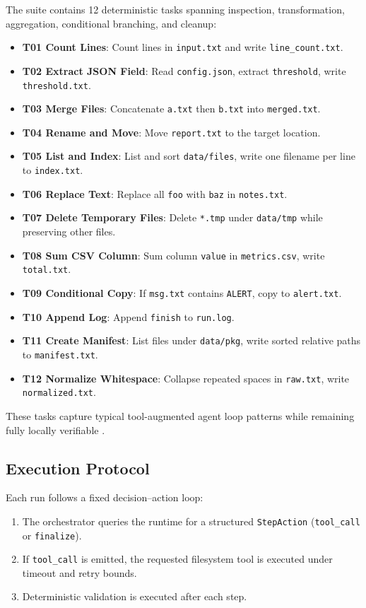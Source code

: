 The suite contains 12 deterministic tasks spanning inspection, transformation, aggregation, conditional branching, and cleanup:
\begin{itemize}
    \item \textbf{T01 Count Lines}: Count lines in \texttt{input.txt} and write \texttt{line\_count.txt}.
    \item \textbf{T02 Extract JSON Field}: Read \texttt{config.json}, extract \texttt{threshold}, write \texttt{threshold.txt}.
    \item \textbf{T03 Merge Files}: Concatenate \texttt{a.txt} then \texttt{b.txt} into \texttt{merged.txt}.
    \item \textbf{T04 Rename and Move}: Move \texttt{report.txt} to the target location.
    \item \textbf{T05 List and Index}: List and sort \texttt{data/files}, write one filename per line to \texttt{index.txt}.
    \item \textbf{T06 Replace Text}: Replace all \texttt{foo} with \texttt{baz} in \texttt{notes.txt}.
    \item \textbf{T07 Delete Temporary Files}: Delete \texttt{*.tmp} under \texttt{data/tmp} while preserving other files.
    \item \textbf{T08 Sum CSV Column}: Sum column \texttt{value} in \texttt{metrics.csv}, write \texttt{total.txt}.
    \item \textbf{T09 Conditional Copy}: If \texttt{msg.txt} contains \texttt{ALERT}, copy to \texttt{alert.txt}.
    \item \textbf{T10 Append Log}: Append \texttt{finish} to \texttt{run.log}.
    \item \textbf{T11 Create Manifest}: List files under \texttt{data/pkg}, write sorted relative paths to \texttt{manifest.txt}.
    \item \textbf{T12 Normalize Whitespace}: Collapse repeated spaces in \texttt{raw.txt}, write \texttt{normalized.txt}.
\end{itemize}

These tasks capture typical tool-augmented agent loop patterns while remaining fully locally verifiable \cite{yao2022react, schick2023toolformer}.

\subsection{Execution Protocol}

Each run follows a fixed decision--action loop:
\begin{enumerate}
    \item The orchestrator queries the runtime for a structured \texttt{StepAction} (\texttt{tool\_call} or \texttt{finalize}).
    \item If \texttt{tool\_call} is emitted, the requested filesystem tool is executed under timeout and retry bounds.
    \item Deterministic validation is executed after each step.
\end{enumerate}

